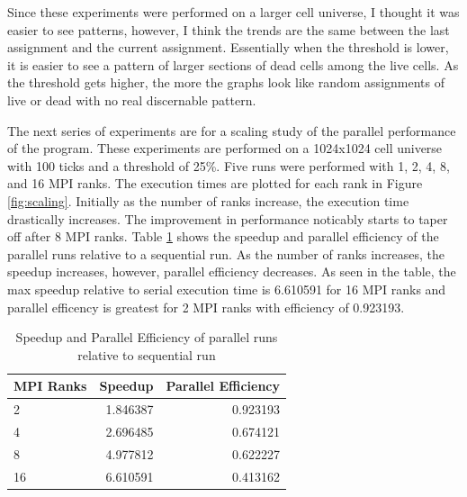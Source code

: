 \documentclass[11pt]{article}
\numberwithin{figure}{section}
\begin{document}
Since these experiments were performed on a larger cell universe, I thought it was easier to see patterns, however, I think the trends are the same between the last assignment and the current assignment.  Essentially when the threshold is lower, it is easier to see a pattern of larger sections of dead cells among the live cells.  As the threshold gets higher, the more the graphs look like random assignments of live or dead with no real discernable pattern.

The next series of experiments are for a scaling study of the parallel performance of the program.  These experiments are performed on a 1024x1024 cell universe with 100 ticks and a threshold of 25\%.  Five runs were performed with 1, 2, 4, 8, and 16 MPI ranks.  The execution times are plotted for each rank in Figure \ref{fig:scaling}.  Initially as the number of ranks increase, the execution time drastically increases.  The improvement in performance noticably starts to taper off after 8 MPI ranks.  Table \ref{speedup} shows the speedup and parallel efficiency of the parallel runs relative to a sequential run.  As the number of ranks increases, the speedup increases, however, parallel efficiency decreases.  As seen in the table, the max speedup relative to serial execution time is 6.610591 for 16 MPI ranks and parallel efficency is greatest for 2 MPI ranks with efficiency of 0.923193.  

\begin{center}
\begin{table}[h]
\begin{tabular}{| l | r | r | }
\hline
MPI Ranks & Speedup & Parallel Efficiency \\ \hline
  2 & 1.846387 & 0.923193 \\ \hline
  4 & 2.696485 & 0.674121 \\ \hline
  8 & 4.977812 & 0.622227 \\ \hline
 16 & 6.610591 & 0.413162 \\ \hline
\end{tabular}
\caption{Speedup and Parallel Efficiency of parallel runs relative to sequential run}
\label{speedup}
\end{table}
\end{center}
\end{document}
